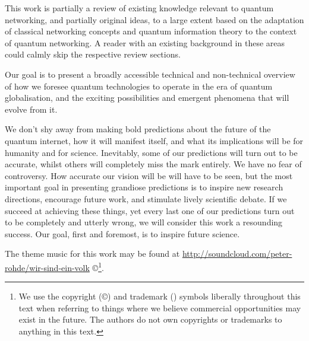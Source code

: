 This work is partially a review of existing knowledge relevant to quantum networking, and partially original ideas, to a large extent based on the adaptation of classical networking concepts and quantum information theory to the context of quantum networking. A reader with an existing background in these areas could calmly skip the respective review sections.

Our goal is to present a broadly accessible technical and non-technical overview of how we foresee quantum technologies to operate in the era of quantum globalisation, and the exciting possibilities and emergent phenomena that will evolve from it.

We don't shy away from making bold predictions about the future of the quantum internet, how it will manifest itself, and what its implications will be for humanity and for science. Inevitably, some of our predictions will turn out to be accurate, whilst others will completely miss the mark entirely. We have no fear of controversy. How accurate our vision will be will have to be seen, but the most important goal in presenting grandiose predictions is to inspire new research directions, encourage future work, and stimulate lively scientific debate. If we succeed at achieving these things, yet every last one of our predictions turn out to be completely and utterly wrong, we will consider this work a resounding success. Our goal, first and foremost, is to inspire future science.

The theme music for this work may be found at \href{http://soundcloud.com/peter-rohde/wir-sind-ein-volk}{http://soundcloud.com/peter-rohde/wir-sind-ein-volk} \copyright{}\footnote{We use the copyright (\copyright) and trademark (\texttrademark) symbols liberally throughout this text when referring to things where we believe commercial opportunities may exist in the future. The authors do not own copyrights or trademarks to anything in this text.}.